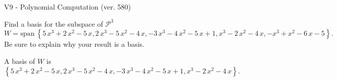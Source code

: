 \begin{exercise}
  \begin{exerciseTitle}V9 - Polynomial Computation (ver. 580)\end{exerciseTitle}
  \begin{exerciseStatement}
    Find a basis for the subspace of \(\mathcal{P}^3\) 
\[W=\mathrm{span}\ \left\{5 \, x^{3} + 2 \, x^{2} - 5 \, x , 2 \, x^{3} - 5 \, x^{2} - 4 \, x , -3 \, x^{3} - 4 \, x^{2} - 5 \, x + 1 , x^{3} - 2 \, x^{2} - 4 \, x , -x^{3} + x^{2} - 6 \, x - 5\right\}.\]
 Be sure to explain why your result is a basis.


  \end{exerciseStatement}
  \begin{exerciseAnswer}
   A basis of \(W\) is  \(\left\{5 \, x^{3} + 2 \, x^{2} - 5 \, x , 2 \, x^{3} - 5 \, x^{2} - 4 \, x , -3 \, x^{3} - 4 \, x^{2} - 5 \, x + 1 , x^{3} - 2 \, x^{2} - 4 \, x\right\}\).
  


  \end{exerciseAnswer}
\end{exercise}